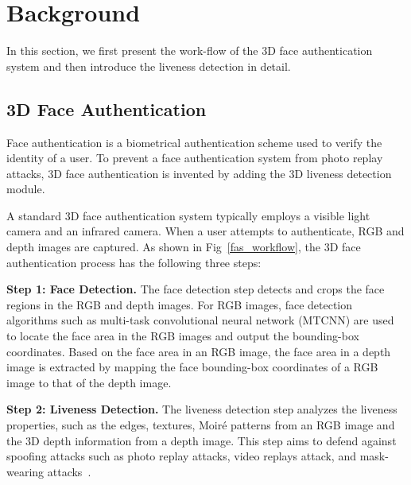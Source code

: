 \section{Background}
\label{sec:background}
In this section, we first present the work-flow of the 3D face authentication system and then introduce the liveness detection in detail.

\subsection{3D Face Authentication}
Face authentication is a biometrical authentication scheme used to verify the identity of a user. To prevent a face authentication system from photo replay attacks, 3D face authentication is invented by adding the 3D liveness detection module. 

A standard 3D face authentication system typically employs a visible light camera and an infrared camera. When a user attempts to authenticate, RGB and depth images are captured. As shown in Fig~\ref{fas_workflow}, the 3D face authentication process has the following three steps:

\textbf{Step 1: Face Detection.} 
The face detection step detects and crops the face regions in the RGB and depth images. For RGB images, face detection algorithms such as multi-task convolutional neural network (MTCNN) \cite{zhang2016joint} are used to locate the face area in the RGB images and output the bounding-box coordinates. Based on the face area in an RGB image, the face area in a depth image is extracted by mapping the face bounding-box coordinates of a RGB image to that of the depth image.

\textbf{Step 2: Liveness Detection.} The liveness detection step analyzes the liveness properties, such as the edges, textures, Moiré patterns
 from an RGB image and the 3D depth information from a depth image. 
This step aims to defend against spoofing attacks such as photo replay attacks, video replays attack, and mask-wearing attacks~\cite{chakka2011competition,anjos2011counter,raghavendra2015presentation, bhattacharjee2018spoofing, nesli2013spoofing}.


